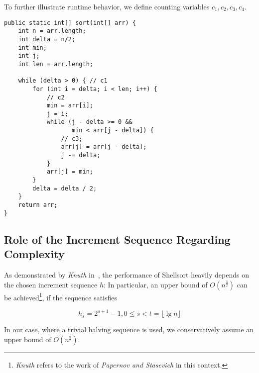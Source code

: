 To further illustrate runtime behavior, we define counting variables $c_1, c_2, c_3, c_4$.

\vspace{4mm}
\begin{lstlisting}[style=javastyle, caption={Shellsort implementation using halving sequences. }, label=lst:shell]
public static int[] sort(int[] arr) {
    int n = arr.length;
    int delta = n/2;
    int min;
    int j;
    int len = arr.length;

    while (delta > 0) { // c1
        for (int i = delta; i < len; i++) {
            // c2
            min = arr[i];
            j = i;
            while (j - delta >= 0 &&
                   min < arr[j - delta]) {
                // c3;
                arr[j] = arr[j - delta];
                j -= delta;
            }
            arr[j] = min;
        }
        delta = delta / 2;
    }
    return arr;
}
\end{lstlisting}
\vspace{4mm}


\subsection{Role of the Increment Sequence Regarding Complexity}

As demonstrated by \textit{Knuth} in~\cite[91]{Knu97b}, the performance of Shellsort heavily  depends on the chosen increment sequence $h$: In particular, an upper bound of $O(n^{\frac{3}{2}})$ can be achieved\footnote{
\textit{Knuth} refers to the work of \textit{Papernov and Stasevich} \cite{PS65} in this context.
}, if the sequence satisfies

\[
    h_s = 2^{s+1} - 1, 0 \leq s < t = \lfloor{\lg n} \rfloor
\]

In our case, where a trivial halving sequence is used, we conservatively assume an upper bound of $O(n^2)$.
